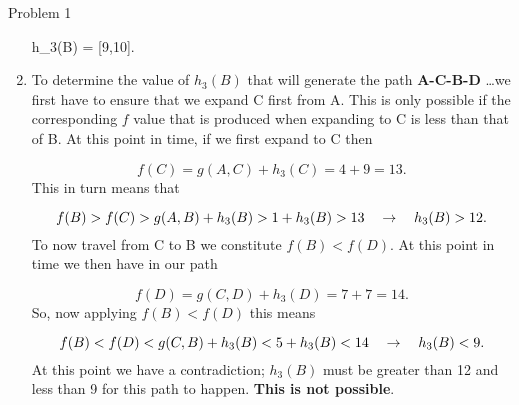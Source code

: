 \begin{problem}{Problem 1}
\begin{highlight}
\begin{enumerate}[label = {\textbf{(\roman*)}}]
            \begin{center}
                \begin{highlightbox}
                    h_{3}(B) = [9,10].
                \end{highlightbox}
            \end{center}

            \item To determine the value of $h_{3}(B)$ that will generate the path \textbf{A-C-B-D} \dots we first have to ensure that we expand C first from A. This is only possible if the corresponding
            $f$ value that is produced when expanding to C is less than that of B. At this point in time, if we first expand to C then

            \begin{equation*}
                f(C) = g(A,C) + h_{3}(C) = 4 + 9 = 13.
            \end{equation*}
            This in turn means that 

            \begin{equation*}
                f(B) > f(C) > g(A,B) + h_{3}(B) > 1 + h_{3}(B) > 13 \hspace*{10pt} \rightarrow \hspace*{10pt} h_{3}(B) > 12.
            \end{equation*}
            To now travel from C to B we constitute $f(B) < f(D)$. At this point in time we then have in our path

            \begin{equation*}
                f(D) = g(C,D) + h_{3}(D) = 7 + 7 = 14.
            \end{equation*}
            So, now applying $f(B) < f(D)$ this means

            \begin{equation*}
                f(B) < f(D) < g(C,B) + h_{3}(B) < 5 + h_{3}(B) < 14 \hspace*{10pt} \rightarrow \hspace*{10pt} h_{3}(B) < 9.
            \end{equation*}
            At this point we have a contradiction; $h_{3}(B)$ must be greater than 12 and less than 9 for this path to happen. \textbf{This is not possible}.
        \end{enumerate}
    \end{highlight}
\end{problem}
